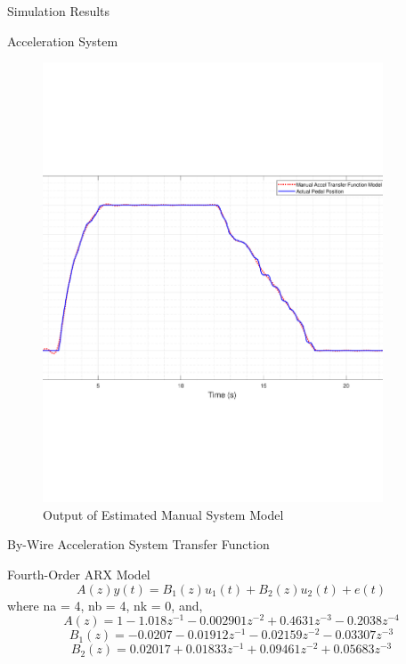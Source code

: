 \documentclass{beamer}
\begin{document}
\begin{frame}{Simulation Results}
\begin{block}{Acceleration System}
\begin{figure}
\begin{minipage}{0.45\textwidth}
        \includegraphics[width=0.9\textwidth]{figs/img/manualAccelTransferFunctionModel} %
        \caption{Output of Estimated Manual System Model}
        \label{fig:manualAccelModel}
    \end{minipage}
\end{figure}
  \end{block}
\end{frame}

\begin{frame}{By-Wire Acceleration System Transfer Function}
	\begin{block}{Fourth-Order ARX Model}
		\begin{equation}
			A(z)y(t) = B_1(z)u_1(t) + B_2(z)u_2(t) + e(t)
		\end{equation}
		where na = 4, nb = 4, nk = 0, and, 
		\begin{equation}
			A(z) = 1 - 1.018z^{-1} - 0.002901z^{-2} + 0.4631z^{-3} - 0.2038z^{-4}
		\end{equation}
		\begin{equation}
			B_1(z) = -0.0207 - 0.01912z^{-1} - 0.02159z^{-2} - 0.03307z^{-3}
		\end{equation}
		\begin{equation}
			B_2(z) = 0.02017 + 0.01833z^{-1} + 0.09461z^{-2} + 0.05683z^{-3}
		\end{equation}
	\end{block}
\end{frame}
\end{document}
